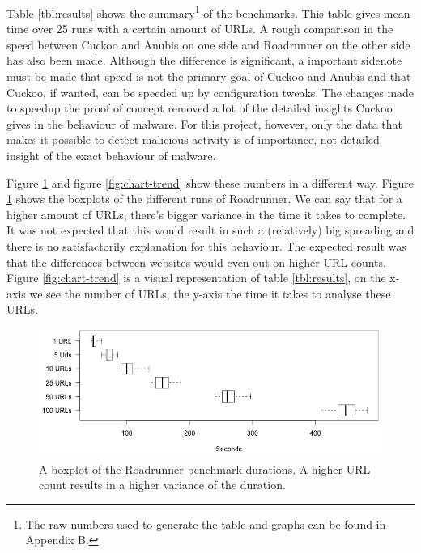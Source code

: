 Table \ref{tbl:results} shows the summary\footnote{The raw numbers used to generate the table and graphs can be found in Appendix B.} of the benchmarks. This table gives mean time over 25 runs with a certain amount of URLs. A rough comparison in the speed between Cuckoo and Anubis on one side and Roadrunner on the other side has also been made. Although the difference is significant, a important sidenote must be made that speed is not the primary goal of Cuckoo and Anubis and that Cuckoo, if wanted, can be speeded up by configuration tweaks. The changes made to speedup the proof of concept removed a lot of the detailed insights Cuckoo gives in the behaviour of malware. For this project, however, only the data that makes it possible to detect malicious activity is of importance, not detailed insight of the exact behaviour of malware.

Figure \ref{fig:chart-box} and figure \ref{fig:chart-trend} show these numbers in a different way. Figure \ref{fig:chart-box} shows the boxplots of the different runs of Roadrunner. We can say that for a higher amount of URLs, there's bigger variance in the time it takes to complete. It was not expected that this would result in such a (relatively) big spreading and there is no satisfactorily explanation for this behaviour. The expected result was that the differences between websites would even out on higher URL counts. Figure \ref{fig:chart-trend} is a visual representation of table \ref{tbl:results}, on the x-axis we see the number of URLs; the y-axis the time it takes to analyse these URLs. 

\restoregeometry
\pagebreak


\begin{figure}[h!]
    \centering
    \centerline{\includegraphics[width=15cm]{Images/chart-box.png}}
    \caption{A boxplot of the Roadrunner benchmark durations. A higher URL count results in a higher variance of the duration.}
    \label{fig:chart-box}
\end{figure}

